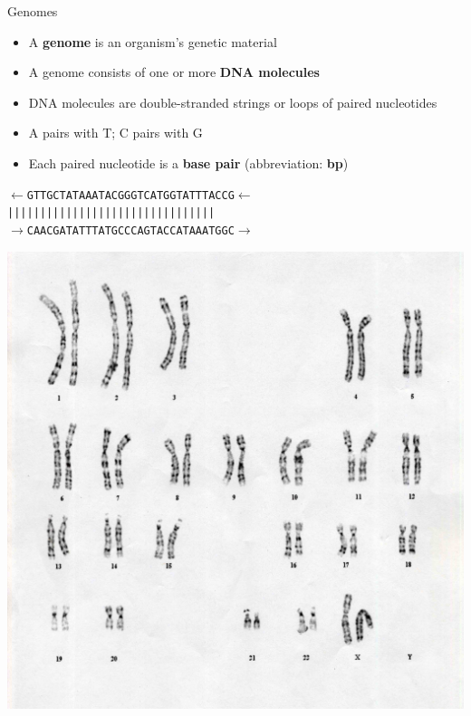 \documentclass[xcolor=dvipsnames]{beamer}
\begin{document}
\begin{frame}{Genomes}
    \begin{minipage}{0.75\textwidth}
        \begin{itemize}
            \item A {\bf genome} is an organism's genetic material
            \item A genome consists of one or more {\bf DNA molecules}
            \item DNA molecules are double-stranded strings or loops of paired
                  nucleotides
            \item A pairs with T; C pairs with G
            \item Each paired nucleotide is a {\bf base pair} (abbreviation: {\bf bp})
        \end{itemize}
            \begin{center}
                {\tt {\bf $\leftarrow$}GTTGCTATAAATACGGGTCATGGTATTTACCG{\bf $\leftarrow$}} \\
                \vspace{-0.14cm}
                {\tt                     ||||||||||||||||||||||||||||||||} \\
                \vspace{-0.14cm}
                {\tt {\bf $\rightarrow$}CAACGATATTTATGCCCAGTACCATAAATGGC{\bf $\rightarrow$}}
            \end{center}
    \end{minipage}
    \begin{minipage}{0.23\textwidth}
        \includegraphics[width=1.0\textwidth]{HumanKaryotype.jpg} \\

\end{minipage}
\end{frame}
\end{document}
